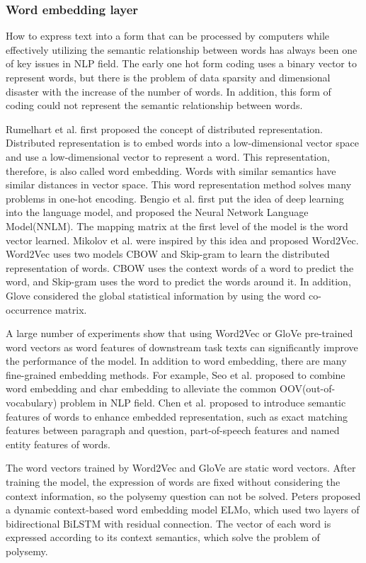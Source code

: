 \documentclass{article}
\begin{document}
\subsubsection{Word embedding layer}
How to express text into a form that can be processed by computers while effectively utilizing the semantic relationship between words 
has always been one of key issues in NLP field. The early one hot form coding uses a binary vector to represent words, but there is the problem of 
data sparsity and dimensional disaster with the increase of the number of words. In addition, this form of coding could not represent the semantic 
relationship between words. 

Rumelhart et al. first proposed the concept of distributed representation. Distributed representation is to embed words into a 
low-dimensional vector space and use a low-dimensional vector to represent a word. This representation, therefore, is also called word embedding. 
Words with similar semantics have similar distances in vector space. This word representation method solves many problems in one-hot encoding. 
Bengio et al. first put the idea of deep learning into the language model, and proposed the Neural Network Language Model(NNLM). The mapping matrix 
at the first level of the model is the word vector learned. Mikolov et al. were inspired by this idea and proposed Word2Vec. 
Word2Vec uses two models CBOW and Skip-gram to learn the distributed representation of words. CBOW uses the context words of a word to predict the word, and 
Skip-gram uses the word to predict the words around it. In addition, Glove considered the global statistical information by using the 
word co-occurrence matrix.

A large number of experiments show that using Word2Vec or GloVe pre-trained word vectors as word features of downstream task texts can 
significantly improve the performance of the model. In addition to word embedding, there are many fine-grained embedding methods. For example, 
Seo et al. proposed to combine word embedding and char embedding to alleviate the common OOV(out-of-vocabulary) problem in NLP field. Chen et al. proposed to 
introduce semantic features of words to enhance embedded representation, such as exact matching features between paragraph and question, part-of-speech features and 
named entity features of words.

The word vectors trained by Word2Vec and GloVe are static word vectors. After training the model, the expression of words are fixed without 
considering the context information, so the polysemy question can not be solved. Peters proposed a dynamic context-based word embedding model ELMo, which 
used two layers of bidirectional BiLSTM with residual connection. The vector of each word is expressed according to its context semantics, which solve the problem of polysemy.
\end{document}
